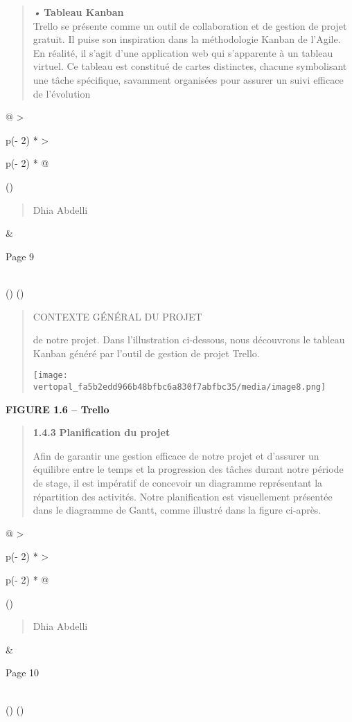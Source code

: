 \documentclass[
]{article}
\begin{document}
\begin{quote}
\emph{•} \textbf{Tableau Kanban}\\
Trello se présente comme un outil de collaboration et de gestion de
projet gratuit. Il puise son inspiration dans la méthodologie Kanban de
l'Agile. En réalité, il s'agit d'une application web qui s'apparente à
un tableau virtuel. Ce tableau est constitué de cartes distinctes,
chacune symbolisant une tâche spécifique, savamment organisées pour
assurer un suivi efficace de l'évolution
\end{quote}

\begin{longtable}[]{@{}
  >{\raggedright\arraybackslash}p{(\columnwidth - 2\tabcolsep) * }
  >{\raggedright\arraybackslash}p{(\columnwidth - 2\tabcolsep) * }@{}}
\toprule()
\begin{minipage}[b]{\linewidth}\raggedright
\begin{quote}
Dhia Abdelli
\end{quote}
\end{minipage} & \begin{minipage}[b]{\linewidth}\raggedright
Page 9
\end{minipage} \\
\midrule()
\endhead
\bottomrule()
\end{longtable}

\begin{quote}
CONTEXTE GÉNÉRAL DU PROJET

de notre projet. Dans l'illustration ci-dessous, nous découvrons le
tableau Kanban généré par l'outil de gestion de projet Trello.

\texttt{[image: vertopal\_fa5b2edd966b48bfbc6a830f7abfbc35/media/image8.png]}
\end{quote}

\textbf{FIGURE 1.6 -- Trello}

\begin{quote}
\textbf{1.4.3} \textbf{Planification du projet}

Afin de garantir une gestion efficace de notre projet et d'assurer un
équilibre entre le temps et la progression des tâches durant notre
période de stage, il est impératif de concevoir un diagramme
représentant la répartition des activités. Notre planification est
visuellement présentée dans le diagramme de Gantt, comme illustré dans
la figure ci-après.
\end{quote}

\begin{longtable}[]{@{}
  >{\raggedright\arraybackslash}p{(\columnwidth - 2\tabcolsep) * }
  >{\raggedright\arraybackslash}p{(\columnwidth - 2\tabcolsep) * }@{}}
\toprule()
\begin{minipage}[b]{\linewidth}\raggedright
\begin{quote}
Dhia Abdelli
\end{quote}
\end{minipage} & \begin{minipage}[b]{\linewidth}\raggedright
Page 10
\end{minipage} \\
\midrule()
\endhead
\bottomrule()
\end{longtable}
\end{document}
